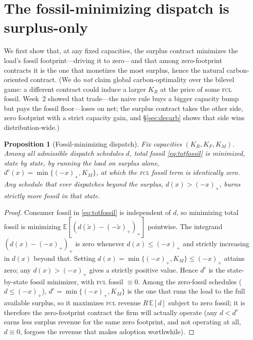 \documentclass[11pt,reqno]{amsart}
\theoremstyle{plain}
\newtheorem{proposition}{Proposition}
\theoremstyle{definition}
\theoremstyle{remark}
\newcommand{\KR}{K_R}
\newcommand{\KF}{K_F}
\newcommand{\KM}{K_M}
\newcommand{\E}{\mathbb{E}}
\begin{document}
\section{The fossil-minimizing dispatch is surplus-only}\label{sec:optcontract}

We first show that, at any fixed capacities, the surplus contract minimizes the load's
fossil footprint---driving it to zero---and that among zero-footprint contracts it is
the one that monetizes the most surplus, hence the natural carbon-oriented contract.
(We do \emph{not} claim global carbon-optimality over the bilevel game: a different
contract could induce a larger $\KR$ at the price of some \textsc{fcl} fossil. Week~2
showed that trade---the naive rule buys a bigger capacity bump but pays the fossil
floor---loses on net; the surplus contract takes the other side, zero footprint with a
strict capacity gain, and \S\ref{sec:decarb} shows that side wins distribution-wide.)

\begin{proposition}[Fossil-minimizing dispatch]\label{prop:surplusopt}
Fix capacities $(\KR,\KF,\KM)$. Among all admissible dispatch schedules $d$, total
fossil \eqref{eq:totfossil} is minimized, state by state, by running the load on
surplus alone, $d^{c}(x)=\min\{(-x)_+,\KM\}$, at which the \textsc{fcl} fossil term is
identically zero. Any schedule that ever dispatches beyond the surplus,
$d(x)>(-x)_+$, burns strictly more fossil in that state.
\end{proposition}

\begin{proof}
Consumer fossil in \eqref{eq:totfossil} is independent of $d$, so minimizing total
fossil is minimizing $\E[(d(\tilde x)-(-\tilde x)_+)_+]$ pointwise. The integrand
$(d(x)-(-x)_+)_+$ is zero whenever $d(x)\le(-x)_+$ and strictly increasing in $d(x)$
beyond that. Setting $d(x)=\min\{(-x)_+,\KM\}\le(-x)_+$ attains zero; any
$d(x)>(-x)_+$ gives a strictly positive value. Hence $d^{c}$ is the state-by-state
fossil minimizer, with \textsc{fcl} fossil $\equiv0$. Among the zero-fossil schedules
($d\le(-x)_+$), $d^{c}=\min\{(-x)_+,\KM\}$ is the one that runs the load to the full
available surplus, so it maximizes \textsc{fcl} revenue $R\,\E[d]$ subject to zero
fossil; it is therefore the zero-footprint contract the firm will actually operate
(any $d<d^{c}$ earns less surplus revenue for the same zero footprint, and not
operating at all, $d\equiv0$, forgoes the revenue that makes adoption worthwhile).
\end{proof}
\end{document}
